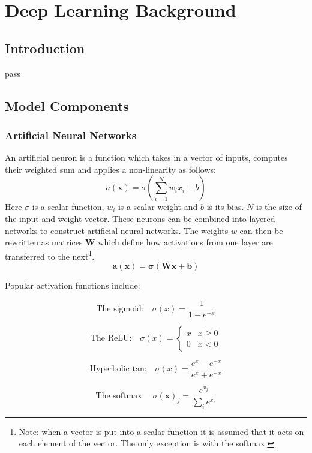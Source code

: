 \chapter{Deep Learning Background} \label{chapter:deep}
  \section{Introduction}
    pass
  \section{Model Components}
    \subsection{Artificial Neural Networks}
  An artificial neuron is a function which takes in a vector of inputs, computes their
  weighted sum and applies a non-linearity as follows:
  \begin{equation}
    a(\mathbf{x}) = \sigma \left ( \sum_{i=1}^N w_ix_i + b \right )
  \end{equation}
  Here $\sigma$ is a scalar function, $w_i$ is a scalar weight and $b$ is its bias. $N$ is the size of the input and weight vector.
  These neurons can be combined into layered networks to construct artificial neural networks.
  The weights $w$ can then be rewritten as matrices $\mathbf{W}$ which define how
  activations from one layer are transferred to the next\footnote{Note: when a vector
  is put into a scalar function it is assumed that it acts on each element of
  the vector. The only exception is with the softmax.}.
  \begin{equation}
    \mathbf{a}(\mathbf{x}) = \mathbf{\sigma} \left ( \mathbf{W}\mathbf{x} + \mathbf{b} \right ) \label{eq:softmax}
  \end{equation}

  Popular activation functions include:
  \begin{multicols}{2}


    \begin{equation}
      \text{The sigmoid:}\quad
      \sigma (x) = \frac{1}{1-e^{-x}} \label{eq:sigmoid}
    \end{equation}


    \begin{equation}
      \text{The ReLU:}\quad
      \sigma(x) =
      \begin{cases}
        x & x\geq 0 \\
        0 & x < 0
      \end{cases}
    \end{equation}


    \begin{equation}
      \text{Hyperbolic tan:}\quad
      \sigma(x)=\frac{e^x - e^{-x}}{e^x + e^{-x}}
    \end{equation}


    \begin{equation}
      \text{The softmax:}\quad
      \sigma(\mathbf{x})_j = \frac{e^{x_j}}{\sum_i e^{x_i}}
    \end{equation}


  \end{multicols}

